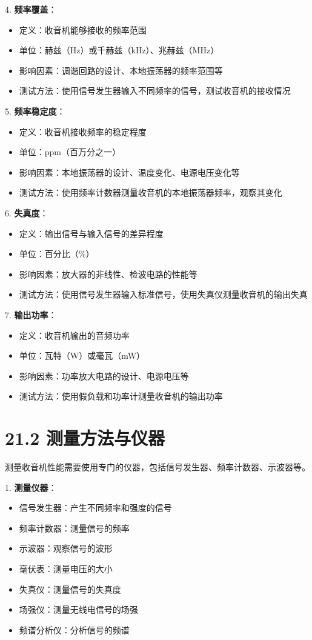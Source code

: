 \documentclass[12pt,UTF8]{ctexbook}
\begin{document}
4. \textbf{频率覆盖}：
   \begin{itemize}[leftmargin=3.5em]
   \item 定义：收音机能够接收的频率范围
   \item 单位：赫兹（Hz）或千赫兹（kHz）、兆赫兹（MHz）
   \item 影响因素：调谐回路的设计、本地振荡器的频率范围等
   \item 测试方法：使用信号发生器输入不同频率的信号，测试收音机的接收情况
   \end{itemize}

5. \textbf{频率稳定度}：
   \begin{itemize}[leftmargin=3.5em]
   \item 定义：收音机接收频率的稳定程度
   \item 单位：ppm（百万分之一）
   \item 影响因素：本地振荡器的设计、温度变化、电源电压变化等
   \item 测试方法：使用频率计数器测量收音机的本地振荡器频率，观察其变化
   \end{itemize}

6. \textbf{失真度}：
   \begin{itemize}[leftmargin=3.5em]
   \item 定义：输出信号与输入信号的差异程度
   \item 单位：百分比（\%）
   \item 影响因素：放大器的非线性、检波电路的性能等
   \item 测试方法：使用信号发生器输入标准信号，使用失真仪测量收音机的输出失真
   \end{itemize}

7. \textbf{输出功率}：
   \begin{itemize}[leftmargin=3.5em]
   \item 定义：收音机输出的音频功率
   \item 单位：瓦特（W）或毫瓦（mW）
   \item 影响因素：功率放大电路的设计、电源电压等
   \item 测试方法：使用假负载和功率计测量收音机的输出功率
   \end{itemize}

\section*{21.2 测量方法与仪器}

测量收音机性能需要使用专门的仪器，包括信号发生器、频率计数器、示波器等。

1. \textbf{测量仪器}：
   \begin{itemize}[leftmargin=3.5em]
   \item 信号发生器：产生不同频率和强度的信号
   \item 频率计数器：测量信号的频率
   \item 示波器：观察信号的波形
   \item 毫伏表：测量电压的大小
   \item 失真仪：测量信号的失真度
   \item 场强仪：测量无线电信号的场强
   \item 频谱分析仪：分析信号的频谱
   \end{itemize}
\end{document}
